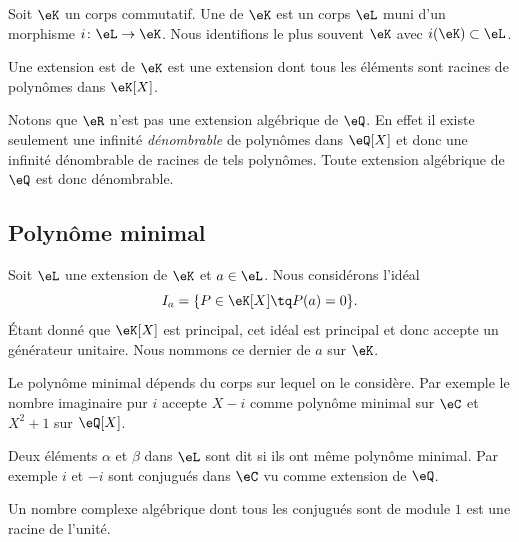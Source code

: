 \begin{definition}
    Soit \( \eK\) un corps commutatif. Une  de \( \eK\) est un corps \( \eL\) muni d'un morphisme \( i\colon \eL\to \eK\). Nous identifions le plus souvent \( \eK\) avec \( i(\eK)\subset \eL\).

    Une extension est  de \( \eK\) est une extension dont tous les éléments sont racines de polynômes dans \( \eK[X]\).
\end{definition}
Notons que \( \eR\) n'est pas une extension algébrique de \( \eQ\). En effet il existe seulement une infinité \emph{dénombrable} de polynômes dans \( \eQ[X]\) et donc une infinité dénombrable de racines de tels polynômes. Toute extension algébrique de \( \eQ\) est donc dénombrable.

\subsection{Polynôme minimal}

Soit \( \eL\) une extension de \( \eK\) et \( a\in \eL\). Nous considérons l'idéal
\begin{equation}
    I_a=\{ P\in \eK[X]\tq P(a)=0 \}.
\end{equation}
Étant donné que \( \eK[X]\) est principal, cet idéal est principal et donc accepte un générateur unitaire. Nous nommons ce dernier  de \( a\) sur \( \eK\).

\begin{example}
Le polynôme minimal dépends du corps sur lequel on le considère. Par exemple le nombre imaginaire pur \( i\) accepte \( X-i\) comme polynôme minimal sur \( \eC\) et \( X^2+1\) sur \( \eQ[X]\).
\end{example}

Deux éléments \( \alpha\) et \( \beta\) dans \( \eL\) sont dit  si ils ont même polynôme minimal. Par exemple \( i\) et \( -i\) sont conjugués dans \( \eC\) vu comme extension de \( \eQ\).

\begin{lemma}[\href{http://allken-bernard.org/pierre/weblog/?p=2061}{Blog de Pierre Bernard}]
    Un nombre complexe algébrique dont tous les conjugués sont de module \( 1\) est une racine de l'unité.
\end{lemma}


